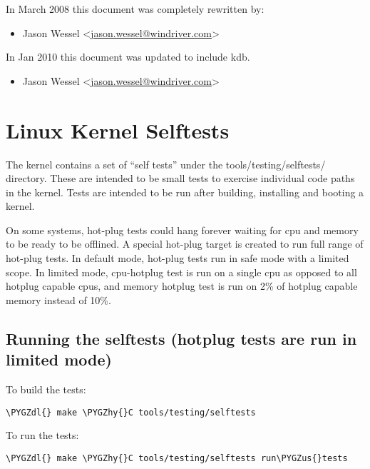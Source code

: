 \documentclass[a4paper,8pt,english]{sphinxmanual}
\def\PYGZus{\char`\_}
\def\PYGZdl{\char`\$}
\def\PYGZhy{\char`\-}
\begin{document}
In March 2008 this document was completely rewritten by:
\begin{itemize}
\item {} 
Jason Wessel \textless{}\href{mailto:jason.wessel@windriver.com}{jason.wessel@windriver.com}\textgreater{}

\end{itemize}

In Jan 2010 this document was updated to include kdb.
\begin{itemize}
\item {} 
Jason Wessel \textless{}\href{mailto:jason.wessel@windriver.com}{jason.wessel@windriver.com}\textgreater{}

\end{itemize}


\chapter{Linux Kernel Selftests}
\label{dev-tools/kselftest:linux-kernel-selftests}\label{dev-tools/kselftest::doc}
The kernel contains a set of ``self tests'' under the tools/testing/selftests/
directory. These are intended to be small tests to exercise individual code
paths in the kernel. Tests are intended to be run after building, installing
and booting a kernel.

On some systems, hot-plug tests could hang forever waiting for cpu and
memory to be ready to be offlined. A special hot-plug target is created
to run full range of hot-plug tests. In default mode, hot-plug tests run
in safe mode with a limited scope. In limited mode, cpu-hotplug test is
run on a single cpu as opposed to all hotplug capable cpus, and memory
hotplug test is run on 2\% of hotplug capable memory instead of 10\%.


\section{Running the selftests (hotplug tests are run in limited mode)}
\label{dev-tools/kselftest:running-the-selftests-hotplug-tests-are-run-in-limited-mode}
To build the tests:

\begin{Verbatim}[commandchars=\\\{\}]
\PYGZdl{} make \PYGZhy{}C tools/testing/selftests
\end{Verbatim}

To run the tests:

\begin{Verbatim}[commandchars=\\\{\}]
\PYGZdl{} make \PYGZhy{}C tools/testing/selftests run\PYGZus{}tests
\end{Verbatim}
\end{document}
